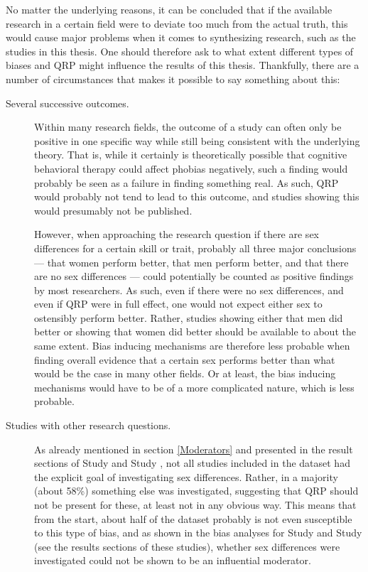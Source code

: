 No matter the underlying reasons, it can be concluded that if the available research in a certain field were to deviate too much from the actual truth, this would cause major problems when it comes to synthesizing research, such as the studies in this thesis. One should therefore ask to what extent different types of biases and QRP might influence the results of this thesis. Thankfully, there are a number of circumstances that makes it possible to say something about this:

\begin{description} \item [Several successive outcomes.] Within many research fields, the outcome of a study can often only be positive in one specific way while still being consistent with the underlying theory. That is, while it certainly is theoretically possible that cognitive behavioral therapy could affect phobias negatively, such a finding would probably be seen as a failure in finding something real. As such, QRP would probably not tend to lead to this outcome, and studies showing this would presumably not be published.

However, when approaching the research question if there are sex differences for a certain skill or trait, probably all three major conclusions --- that women perform better, that men perform better, and that there are no sex differences --- could potentially be counted as positive findings by most researchers. As such, even if there were no sex differences, and even if QRP were in full effect, one would not expect either sex to ostensibly perform better. Rather, studies showing either that men did better or showing that women did better should be available to about the same extent. Bias inducing mechanisms are therefore less probable when finding overall evidence that a certain sex performs better than what would be the case in many other fields. Or at least, the bias inducing mechanisms would have to be of a more complicated nature, which is less probable.

\item [Studies with other research questions.] As already mentioned in section \ref{Moderators} and presented in the result sections of Study  and Study , not all studies included in the dataset had the explicit goal of investigating sex differences. Rather, in a majority (about 58\%) something else was investigated, suggesting that QRP should not be present for these, at least not in any obvious way. This means that from the start, about half of the dataset probably is not even susceptible to this type of bias, and as shown in the bias analyses for Study  and Study  (see the results sections of these studies), whether sex differences were investigated could not be shown to be an influential moderator.


\end{description}
